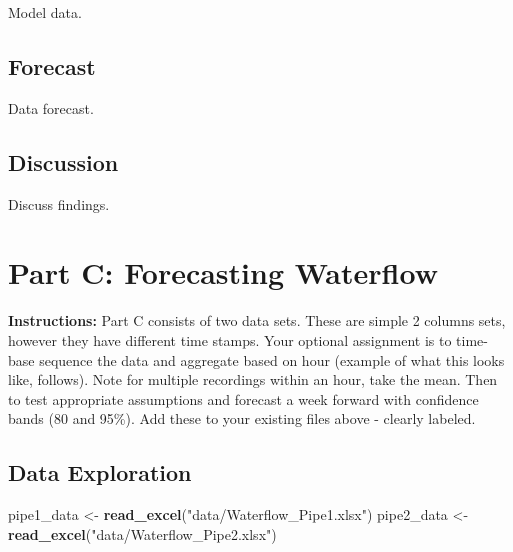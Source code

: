 \documentclass[openany]{book}
\newenvironment{Shaded}{\begin{snugshade}}{\end{snugshade}}
\newcommand{\KeywordTok}[1]{\textcolor[rgb]{0.13,0.29,0.53}{\textbf{#1}}}
\newcommand{\NormalTok}[1]{#1}
\newcommand{\StringTok}[1]{\textcolor[rgb]{0.31,0.60,0.02}{#1}}
\renewenvironment{quote}{\begin{myquote}}{\end{myquote}}
\begin{document}
Model data.

\hypertarget{b-forecast}{%
\section*{Forecast}\label{b-forecast}}

Data forecast.

\hypertarget{b-discussion}{%
\section*{Discussion}\label{b-discussion}}

Discuss findings.

\hypertarget{part-C}{%
\chapter*{Part C: Forecasting Waterflow}\label{part-C}}

\begin{quote}
\textbf{Instructions:} Part C consists of two data sets. These are simple 2 columns sets, however they have different time stamps. Your optional assignment is to time-base sequence the data and aggregate based on hour (example of what this looks like, follows). Note for multiple recordings within an hour, take the mean. Then to test appropriate assumptions and forecast a week forward with confidence bands (80 and 95\%). Add these to your existing files above - clearly labeled.
\end{quote}

\hypertarget{c-exploration}{%
\section*{Data Exploration}\label{c-exploration}}

\begin{Shaded}
\begin{Highlighting}[]
\NormalTok{pipe1_data <-}\StringTok{ }\KeywordTok{read_excel}\NormalTok{(}\StringTok{"data/Waterflow_Pipe1.xlsx"}\NormalTok{)}
\NormalTok{pipe2_data <-}\StringTok{ }\KeywordTok{read_excel}\NormalTok{(}\StringTok{"data/Waterflow_Pipe2.xlsx"}\NormalTok{)}
\end{Highlighting}
\end{Shaded}
\end{document}
